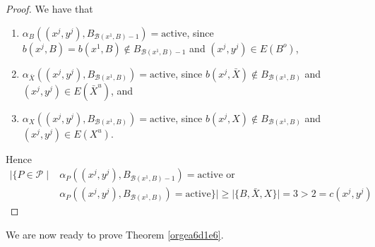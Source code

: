 \documentclass[fontsize=11pt,paper=a4]{book}
\begin{document}
\begin{proof}
We have that

\begin{enumerate}
\item \(\alpha_B((x^j,y^j),B_{\mathcal{B}(x^1,B)-1})=\mathrm{active}\), since \(b(x^j,B)=b(x^1,B)\notin B_{\mathcal{B}(x^1,B)-1}\) and \((x^j,y^j)\in E(B^o)\),

\item \(\alpha_{\bar{X}}((x^j,y^j),B_{\mathcal{B}(x^1,B)})=\mathrm{active}\), since \(b(x^j,\bar{X})\notin B_{\mathcal{B}(x^1,B)}\) and \((x^j,y^j)\in E(\bar{X}^u)\), and

\item \(\alpha_{X}((x^j,y^j),B_{\mathcal{B}(x^1,B)})=\mathrm{active}\), since \(b(x^j,X)\notin B_{\mathcal{B}(x^1,B)}\) and \((x^j,y^j)\in E(X^u)\).
\end{enumerate}

Hence
\begin{align*}
\lvert\{P\in\mathcal{P}\mid&\alpha_P((x^j,y^j),B_{\mathcal{B}(x^1,B)-1})=\mathrm{active}\text{ or }\\
&\alpha_P((x^j,y^j),B_{\mathcal{B}(x^1,B)})=\mathrm{active}\}\rvert\geq\lvert\{B,\bar{X},X\}\rvert=3>2=c(x^j,y^j)
\end{align*}
\end{proof}

We are now ready to prove Theorem \ref{orgea6d1e6}.
\end{document}
